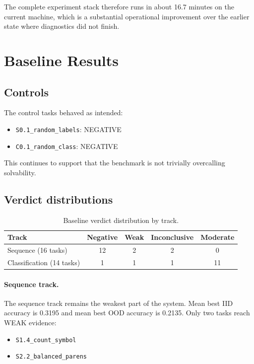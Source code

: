 \documentclass[11pt]{article}
\begin{document}
The complete experiment stack therefore runs in about 16.7 minutes on the current machine, which is a substantial operational improvement over the earlier state where diagnostics did not finish.

\section{Baseline Results}

\subsection{Controls}

The control tasks behaved as intended:

\begin{itemize}
  \item \texttt{S0.1\_random\_labels}: NEGATIVE
  \item \texttt{C0.1\_random\_class}: NEGATIVE
\end{itemize}

This continues to support that the benchmark is not trivially overcalling solvability.

\subsection{Verdict distributions}

\begin{table}[H]
\centering
\caption{Baseline verdict distribution by track.}
\begin{tabular}{lcccc}
\toprule
Track & Negative & Weak & Inconclusive & Moderate \\
\midrule
Sequence (16 tasks) & 12 & 2 & 2 & 0 \\
Classification (14 tasks) & 1 & 1 & 1 & 11 \\
\bottomrule
\end{tabular}
\end{table}

\paragraph{Sequence track.}
The sequence track remains the weakest part of the system. Mean best IID accuracy is 0.3195 and mean best OOD accuracy is 0.2135. Only two tasks reach WEAK evidence:

\begin{itemize}
  \item \texttt{S1.4\_count\_symbol}
  \item \texttt{S2.2\_balanced\_parens}
\end{itemize}
\end{document}
